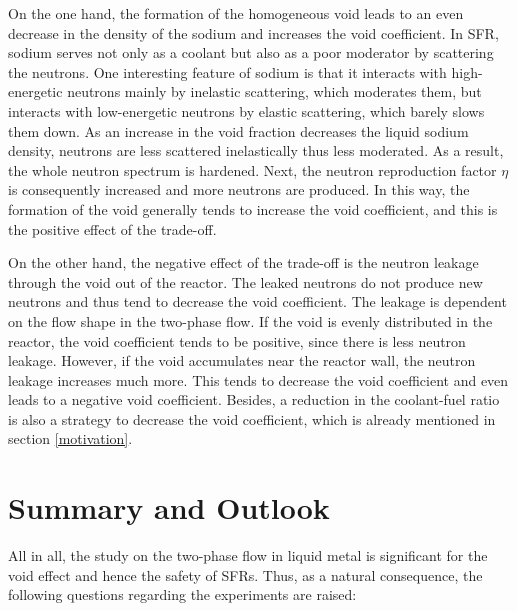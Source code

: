 \documentclass{article}
\begin{document}
On the one hand, the formation of the homogeneous void leads to an even decrease in the density of the sodium and increases the void coefficient. In SFR, sodium serves not only as a coolant but also as a poor moderator by scattering the neutrons. %
One interesting feature of sodium is that it interacts with high-energetic neutrons mainly by inelastic scattering, which moderates them, but interacts with low-energetic neutrons by elastic scattering, which barely slows them down. As an increase in the void fraction decreases the liquid sodium density, neutrons are less scattered inelastically thus less moderated. As a result, the whole neutron spectrum is hardened. Next, the neutron reproduction factor $\eta$ is consequently increased and more neutrons are produced. In this way, the formation of the void generally tends to increase the void coefficient, and this is the positive effect of the trade-off. \cite{ lamarshIntroductionNuclearEngineering2001, tommasiValidationSodiumVoid2010}

On the other hand, the negative effect of the trade-off is the neutron leakage through the void out of the reactor. The leaked neutrons do not produce new neutrons and thus tend to decrease the void coefficient. The leakage is dependent on the flow shape in the two-phase flow. If the void is evenly distributed in the reactor, the void coefficient tends to be positive, since there is less neutron leakage. However, if the void accumulates near the reactor wall, the neutron leakage increases much more. This tends to decrease the void coefficient and even leads to a negative void coefficient. Besides, a reduction in the coolant-fuel ratio is also a strategy to decrease the void coefficient, which is already mentioned in section \ref{motivation}. \cite{lamarshIntroductionNuclearEngineering2001}

\section{Summary and Outlook}
All in all, the study on the two-phase flow in liquid metal is significant for the void effect and hence the safety of SFRs. Thus, as a natural consequence, the following questions regarding the experiments are raised: 
\end{document}
